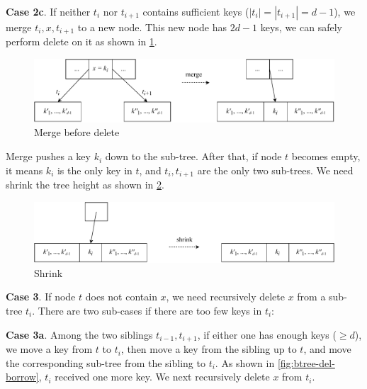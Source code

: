 \documentclass[b5paper]{article}
\begin{document}
\textbf{Case 2c}. If neither $t_i$ nor $t_{i+1}$ contains sufficient keys ($|t_i| = |t_{i+1}| = d - 1$), we merge $t_i, x, t_{i+1}$ to a new node. This new node has $2d - 1$ keys, we can safely perform delete on it as shown in \cref{fig:btree-del-merge}.

\begin{figure}[htbp]
  \centering
  \includegraphics[scale=0.6]{img/btree-del-merge}
  \caption{Merge before delete}
  \label{fig:btree-del-merge}
\end{figure}

Merge pushes a key $k_i$ down to the sub-tree. After that, if node $t$ becomes empty, it means $k_i$ is the only key in $t$, and $t_i, t_{i+1}$ are the only two sub-trees. We need shrink the tree height as shown in \cref{fig:btree-del-shrink}.

\begin{figure}[htbp]
  \centering
  \includegraphics[scale=0.6]{img/btree-del-shrink}
  \caption{Shrink}
  \label{fig:btree-del-shrink}
\end{figure}

\textbf{Case 3}. If node $t$ does not contain $x$, we need recursively delete $x$ from a sub-tree $t_i$. There are two sub-cases if there are too few keys in $t_i$:

\textbf{Case 3a}. Among the two siblings $t_{i-1}, t_{i+1}$, if either one has enough keys ($\geq d$), we move a key from $t$ to $t_i$, then move a key from the sibling up to $t$, and move the corresponding sub-tree from the sibling to $t_i$. As shown in \cref{fig:btree-del-borrow}, $t_i$ received one more key. We next recursively delete $x$ from $t_i$.
\end{document}
